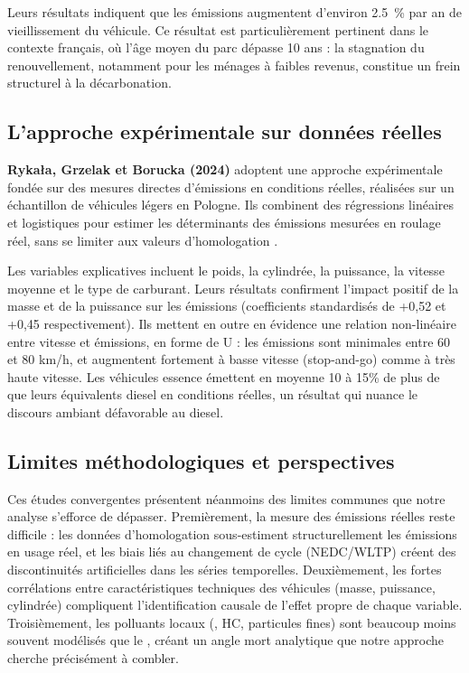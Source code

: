 \documentclass[12pt, a4paper]{article}
\begin{document}
Leurs résultats indiquent que les émissions augmentent d'environ \SI{2.5}{\percent} par an de vieillissement du véhicule. Ce résultat est particulièrement pertinent dans le contexte français, où l'âge moyen du parc dépasse 10 ans : la stagnation du renouvellement, notamment pour les ménages à faibles revenus, constitue un frein structurel à la décarbonation.

\subsection{L'approche expérimentale sur données réelles}

\textbf{Rykała, Grzelak et Borucka (2024)} adoptent une approche expérimentale fondée sur des mesures directes d'émissions en conditions réelles, réalisées sur un échantillon de véhicules légers en Pologne. Ils combinent des régressions linéaires et logistiques pour estimer les déterminants des émissions mesurées en roulage réel, sans se limiter aux valeurs d'homologation \cite{rykala2024}.

Les variables explicatives incluent le poids, la cylindrée, la puissance, la vitesse moyenne et le type de carburant. Leurs résultats confirment l'impact positif de la masse et de la puissance sur les émissions (coefficients standardisés de +0,52 et +0,45 respectivement). Ils mettent en outre en évidence une relation non-linéaire entre vitesse et émissions, en forme de U : les émissions sont minimales entre 60 et 80 km/h, et augmentent fortement à basse vitesse (stop-and-go) comme à très haute vitesse. Les véhicules essence émettent en moyenne 10 à 15\% de plus de  que leurs équivalents diesel en conditions réelles, un résultat qui nuance le discours ambiant défavorable au diesel.

\subsection{Limites méthodologiques et perspectives}

Ces études convergentes présentent néanmoins des limites communes que notre analyse s'efforce de dépasser. Premièrement, la mesure des émissions réelles reste difficile : les données d'homologation sous-estiment structurellement les émissions en usage réel, et les biais liés au changement de cycle (NEDC/WLTP) créent des discontinuités artificielles dans les séries temporelles. Deuxièmement, les fortes corrélations entre caractéristiques techniques des véhicules (masse, puissance, cylindrée) compliquent l'identification causale de l'effet propre de chaque variable. Troisièmement, les polluants locaux (, HC, particules fines) sont beaucoup moins souvent modélisés que le , créant un angle mort analytique que notre approche cherche précisément à combler.
\end{document}
